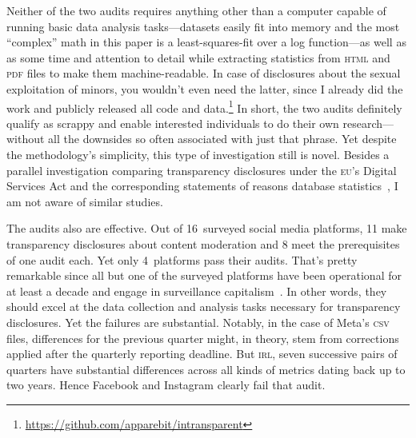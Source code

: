\documentclass[nonacm,screen]{acmart}
\newcommand\V[1]{\textsc{\MakeLowercase{#1}}}
\begin{document}
Neither of the two audits requires anything other than a computer capable of
running basic data analysis tasks---datasets easily fit into memory and the most
``complex'' math in this paper is a least-squares-fit over a log function---as
well as as some time and attention to detail while extracting statistics from
\V{HTML} and \V{PDF} files to make them machine-readable. In case of disclosures
about the sexual exploitation of minors, you wouldn't even need the latter,
since I already did the work and publicly released all code and
data.\footnote{\label{fn:intransparent}\url{https://github.com/apparebit/intransparent}}
In short, the two audits definitely qualify as scrappy and enable interested
individuals to do their own research---without all the downsides so often
associated with just that phrase. Yet despite the methodology's simplicity, this
type of investigation still is novel. Besides a parallel investigation comparing
transparency disclosures under the \V{EU}'s Digital Services Act and the
corresponding statements of reasons database
statistics~\cite{TrujilloFagniea2024}, I am not aware of similar studies.

The audits also are effective. Out of 16~surveyed social media platforms, 11
make transparency disclosures about content moderation and 8 meet the
prerequisites of one audit each. Yet only 4~platforms pass their audits. That's
pretty remarkable since all but one of the surveyed platforms have been
operational for at least a decade and engage in surveillance
capitalism~\cite{Zuboff2019}. In other words, they should excel at the data
collection and analysis tasks necessary for transparency disclosures. Yet the
failures are substantial. Notably, in the case of Meta's \V{CSV} files,
differences for the previous quarter might, in theory, stem from corrections
applied after the quarterly reporting deadline. But \V{IRL}, seven successive
pairs of quarters have substantial differences across all kinds of metrics
dating back up to two years. Hence Facebook and Instagram clearly fail that
audit.
\end{document}

